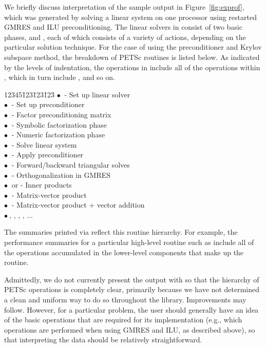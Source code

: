 We briefly discuss interpretation of the sample output in
Figure~\ref{fig:exprof}, which was generated by solving a linear
system on one processor using restarted GMRES and ILU
preconditioning.  The linear solvers in  consist of two
basic phases,  and , each of which
consists of a variety of actions, depending on the particular
solution technique.
For the case of using the  preconditioner and 
Krylov subspace method, the breakdown of PETSc routines is listed below.
As indicated by the levels of indentation, the
operations in  include all of the operations within
, which in turn include , and so on. 
\newcommand{\bu}{$\bullet \: $}
\begin{tabbing}
12345\=123\=123\=123\= \kill
\> \bu {} - Set up linear solver\\
\>\> \bu {} - Set up preconditioner\\
\>\>\> \bu {} - Factor preconditioning matrix\\
\>\>\>\> \bu {} - Symbolic factorization phase\\
\>\>\>\> \bu {} - Numeric factorization phase\\
\> \bu {} - Solve linear system\\
\>\> \bu {} - Apply preconditioner\\
\>\>\> \bu {} - Forward/backward triangular solves\\
\>\> \bu {} - Orthogonalization in GMRES\\
\>\>\> \bu {} or  - Inner products\\
\>\> \bu {} - Matrix-vector product\\
\>\> \bu {} - Matrix-vector product + vector addition\\
\>\> \bu  {}, , , , ...\\
\end{tabbing}

The summaries printed via  reflect this 
routine hierarchy. For example, the performance summaries for a
particular high-level routine such as  include all of
the operations accumulated in the lower-level components that
make up the routine.  

Admittedly, we do not currently present the output with  so that the hierarchy of PETSc operations is completely
clear, primarily because we have not determined a clean and uniform
way to do so throughout the library.  Improvements may follow.
However, for a particular problem, the user should generally have
an idea of the basic operations that are required for its
implementation (e.g., which operations are performed when using GMRES
and ILU, as described above), so that interpreting the 
data should be relatively straightforward.

